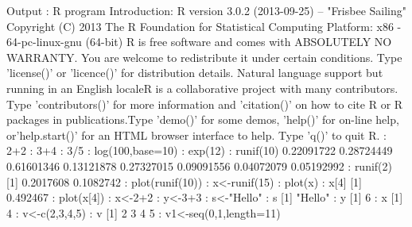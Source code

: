\documentclass[a4paper,12pt]{article}
\begin{document}
{{Output :
R program Introduction:
R version 3.0.2 (2013-09-25) -- "Frisbee Sailing"
\newline
Copyright (C) 2013 The R Foundation for Statistical Computing
Platform: x86 - 64-pc-linux-gnu (64-bit) R is free software and comes 
with ABSOLUTELY NO WARRANTY. You are welcome to redistribute it under certain conditions. Type 'license()' or 'licence()' for distribution details. Natural language support but running in an English localeR is a collaborative project with many contributors. Type 'contributors()' for more information and 'citation()' on how to cite R or R packages in publications.Type 'demo()' for some demos, 'help()' for on-line help, or'help.start()' for an HTML browser interface to help. Type 'q()' to quit R.
\newline
: 2+2
\newline
: 3+4
\newline
: 3/5
\newline
: log(100,base=10)
\newline
: exp(12)
\newline
: runif(10)
 0.22091722 0.28724449 0.61601346 0.13121878 0.27327015
 0.09091556 0.04072079 0.05192992
\newline
: runif(2)
[1] 0.2017608 0.1082742
\newline
: plot(runif(10))
\newline
: x<-runif(15)
\newline
: plot(x)
\newline
: x[4]
[1] 0.492467
\newline
: plot(x[4])
\newline
: x<-2+2
\newline
: y<-3+3
\newline
: s<-"Hello"
\newline
: s
[1] "Hello"
\newline
: y
[1] 6
\newline
: x
[1] 4
\newline
: v<-c(2,3,4,5)
\newline
: v
[1] 2 3 4 5
\newline
: v1<-seq(0,1,length=11)
\newline

}}
\end{document}
